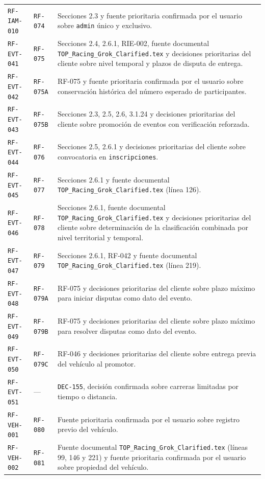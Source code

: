 \documentclass[10pt,letterpaper]{article}
\begin{document}
\begin{landscape}
\begin{longtable}{P{2.7cm}P{2.6cm}P{15.7cm}}
\texttt{RF-IAM-010} & \texttt{RF-074} & Secciones 2.3 y fuente prioritaria confirmada por el usuario sobre \texttt{admin} único y exclusivo.\\
\texttt{RF-EVT-041} & \texttt{RF-075} & Secciones 2.4, 2.6.1, RIE-002, fuente documental \texttt{TOP\_Racing\_Grok\_Clarified.tex} y decisiones prioritarias del cliente sobre nivel temporal y plazos de disputa de entrega.\\
\texttt{RF-EVT-042} & \texttt{RF-075A} & RF-075 y fuente prioritaria confirmada por el usuario sobre conservación histórica del número esperado de participantes.\\
\texttt{RF-EVT-043} & \texttt{RF-075B} & Secciones 2.3, 2.5, 2.6, 3.1.24 y decisiones prioritarias del cliente sobre promoción de eventos con verificación reforzada.\\
\texttt{RF-EVT-044} & \texttt{RF-076} & Secciones 2.5, 2.6.1 y decisiones prioritarias del cliente sobre convocatoria en \texttt{inscripciones}.\\
\texttt{RF-EVT-045} & \texttt{RF-077} & Secciones 2.6.1 y fuente documental \texttt{TOP\_Racing\_Grok\_Clarified.tex} (línea 126).\\
\texttt{RF-EVT-046} & \texttt{RF-078} & Secciones 2.6.1, fuente documental \texttt{TOP\_Racing\_Grok\_Clarified.tex} y decisiones prioritarias del cliente sobre determinación de la clasificación combinada por nivel territorial y temporal.\\
\texttt{RF-EVT-047} & \texttt{RF-079} & Secciones 2.6.1, RF-042 y fuente documental \texttt{TOP\_Racing\_Grok\_Clarified.tex} (línea 219).\\
\texttt{RF-EVT-048} & \texttt{RF-079A} & RF-075 y decisiones prioritarias del cliente sobre plazo máximo para iniciar disputas como dato del evento.\\
\texttt{RF-EVT-049} & \texttt{RF-079B} & RF-075 y decisiones prioritarias del cliente sobre plazo máximo para resolver disputas como dato del evento.\\
\texttt{RF-EVT-050} & \texttt{RF-079C} & RF-046 y decisiones prioritarias del cliente sobre entrega previa del vehículo al promotor.\\
\texttt{RF-EVT-051} & --- & \texttt{DEC-155}, decisión confirmada sobre carreras limitadas por tiempo o distancia.\\
\texttt{RF-VEH-001} & \texttt{RF-080} & Fuente prioritaria confirmada por el usuario sobre registro previo del vehículo.\\
\texttt{RF-VEH-002} & \texttt{RF-081} & Fuente documental \texttt{TOP\_Racing\_Grok\_Clarified.tex} (líneas 99, 146 y 221) y fuente prioritaria confirmada por el usuario sobre propiedad del vehículo.\\

\end{longtable}
\end{landscape}
\end{document}
